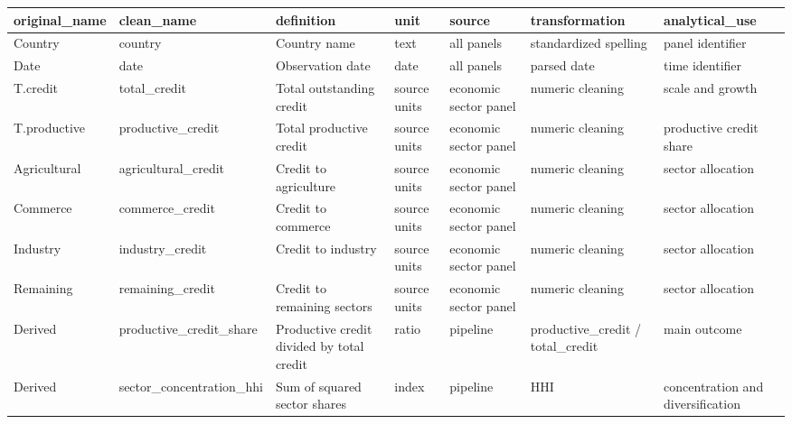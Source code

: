 ﻿%
\begin{tabular}{lllllll}
\hline
original_name & clean_name & definition & unit & source & transformation & analytical_use \\
\hline
Country & country & Country name & text & all panels & standardized spelling & panel identifier \\
Date & date & Observation date & date & all panels & parsed date & time identifier \\
T.credit & total\_credit & Total outstanding credit & source units & economic sector panel & numeric cleaning & scale and growth \\
T.productive & productive\_credit & Total productive credit & source units & economic sector panel & numeric cleaning & productive credit share \\
Agricultural & agricultural\_credit & Credit to agriculture & source units & economic sector panel & numeric cleaning & sector allocation \\
Commerce & commerce\_credit & Credit to commerce & source units & economic sector panel & numeric cleaning & sector allocation \\
Industry & industry\_credit & Credit to industry & source units & economic sector panel & numeric cleaning & sector allocation \\
Remaining & remaining\_credit & Credit to remaining sectors & source units & economic sector panel & numeric cleaning & sector allocation \\
Derived & productive\_credit\_share & Productive credit divided by total credit & ratio & pipeline & productive\_credit / total\_credit & main outcome \\
Derived & sector\_concentration\_hhi & Sum of squared sector shares & index & pipeline & HHI & concentration and diversification \\
\hline
\end{tabular}

